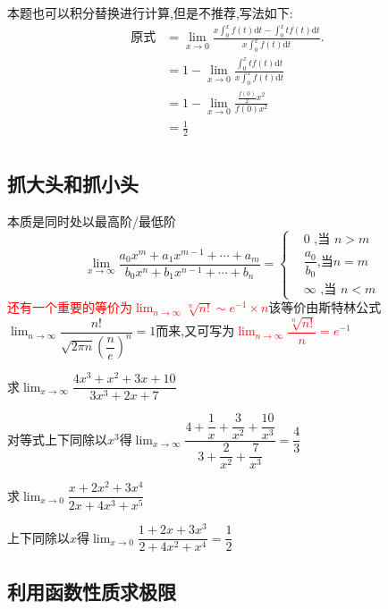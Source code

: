 \documentclass[8pt a4paper, oneside, UTF8]{ctexbook}
\begin{document}
\begin{sloppypar}
\begin{note}
        本题也可以积分替换进行计算,但是不推荐,写法如下:
        \begin{align*}
             \text{原式} & = \lim_{x\to0}\frac{x\int_{0}^{x}f(t)\mathrm{d}t-\int_{0}^{x}tf\left(t\right)\mathrm{d}t}{x\!\int_{0}^{x}f(t)\mathrm{d}t}. & \\
             & = 1-\lim_{x\to0}\frac{\int_{0}^{x}tf\left(t\right)\mathrm{d}t}{x\int_{0}^{x}f\left(t\right)\mathrm{d}t} & \\
             & =1-\lim_{x\to0}\frac{\frac{f\left(0\right)}{2}x^{2}}{f\left(0\right)x^{2}} & \\
             & =\frac{1}{2} &\\
        \end{align*}
    \end{note}
    \subsection{抓大头和抓小头}
    本质是同时处以最高阶/最低阶
    $$
    \lim_{x\to\infty}\dfrac{a_0x^m+a_1x^{m-1}+\cdots+a_m}{b_0x^n+b_1x^{n-1}+\cdots+b_n}=\left.\left\{\begin{aligned}&0\text{ ,当 }n>m\\&\dfrac{a_0}{b_0}\text{,当}n=m\\&\infty\text{ ,当 }n<m\end{aligned}\right.\right.
    $$
    \textcolor{red}{还有一个重要的等价为$\lim_{n\to \infty}\sqrt[n]{n!}\sim e^{-1}\times n$}该等价由斯特林公式$\lim_{n\to\infty}\dfrac{n!}{\sqrt{2\pi n}\left(\dfrac ne\right)^n}=1$而来,又可写为\textcolor{red}{$\lim_{n\rightarrow\infty}\dfrac{\sqrt[n]{n!}}{n}=e^{-1}$}\label{stlgs1}
    \begin{problem}
        求$\lim_{x\to \infty}\dfrac{4x^3+x^2+3x+10}{3x^3+2x+7}$
    \end{problem}
    \begin{solution}
        对等式上下同除以$x^3$得$\lim_{x \to \infty}\dfrac{4+\dfrac1x+\dfrac3{x^2}+\dfrac{10}{x^3}}{3+\dfrac2{x^2}+\dfrac7{x^3}}=\dfrac{4}{3}$
    \end{solution}
    \begin{problem}
        求$\lim_{x\to 0}\dfrac{x+2x^{2}+3x^{4}}{2x+4x^{3}+x^{5}}$
    \end{problem}
    \begin{solution}
        上下同除以$x$得$\lim_{x\to 0}\dfrac{1+2x+3x^{3}}{2+4x^{2}+x^{4}}=\dfrac{1}{2}$
    \end{solution}
    \subsection{利用函数性质求极限}

\end{sloppypar}
\end{document}
